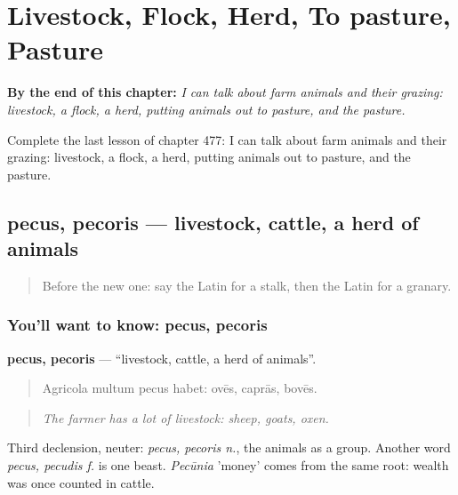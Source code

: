 
\chapter{Livestock, Flock, Herd, To pasture, Pasture}
\label{ch:la-livestock-flock-herd-to-pasture-pasture}

\begin{chapteropening}
\textbf{By the end of this chapter:} \emph{I can talk about farm animals and their grazing: livestock, a flock, a herd, putting animals out to pasture, and the pasture.}

Complete the last lesson of chapter 477: I can talk about farm animals and their grazing: livestock, a flock, a herd, putting animals out to pasture, and the pasture.
\end{chapteropening}

\section[pecus, pecoris]{pecus, pecoris — livestock, cattle, a herd of animals}

\label{lesson:LA-C477-pecus}



\begin{quote}
Before the new one: say the Latin for a stalk, then the Latin for a granary.
\end{quote}

\subsection*{You'll want to know: pecus, pecoris}
\textbf{pecus, pecoris} — \textquotedblleft{}livestock, cattle, a herd of animals\textquotedblright{}.

\begin{quote}
Agricola multum pecus habet: ovēs, caprās, bovēs.
\end{quote}

\begin{quote}
\emph{The farmer has a lot of livestock: sheep, goats, oxen.}
\end{quote}

Third declension, neuter: \emph{pecus, pecoris n.}, the animals as a group. Another word \emph{pecus, pecudis f.} is one beast. \emph{Pecūnia} 'money' comes from the same root: wealth was once counted in cattle.

